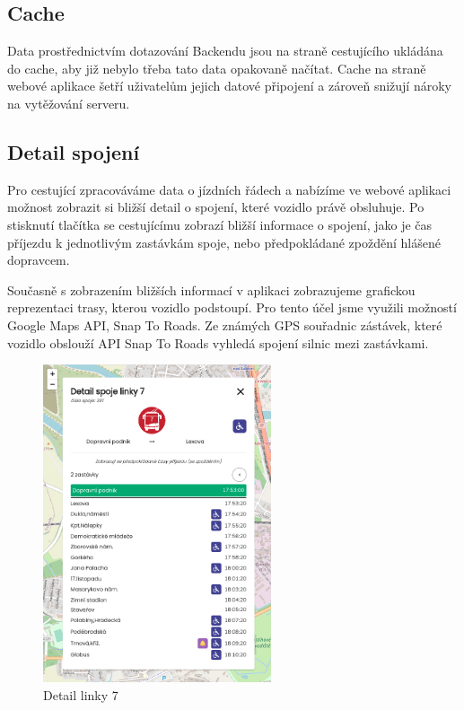 \subsection{Cache}
Data prostřednictvím dotazování Backendu jsou na straně cestujícího ukládána do cache, aby již nebylo třeba tato data opakovaně načítat.
Cache na straně webové aplikace šetří uživatelům jejich datové připojení a zároveň snižují nároky na vytěžování serveru.

\subsection{Detail spojení}
Pro cestující zpracováváme data o jízdních řádech a nabízíme ve webové aplikaci možnost zobrazit si bližší detail o spojení, které vozidlo právě obsluhuje.
Po stisknutí tlačítka se cestujícímu zobrazí bližší informace o spojení, jako je čas příjezdu k jednotlivým zastávkám spoje, nebo předpokládané zpoždění hlášené dopravcem.

Současně s zobrazením bližších informací v aplikaci zobrazujeme grafickou reprezentaci trasy, kterou vozidlo podstoupí.
Pro tento účel jsme využili možností Google Maps API, Snap To Roads. Ze známých GPS souřadnic zástávek, které vozidlo obslouží API Snap To Roads vyhledá spojení silnic mezi zastávkami.

\par
\begin{figure}[h]
    \centering
    \includegraphics[width=0.6\textwidth]{images/global_pce_con_detail_7.png}
    \caption{Detail linky 7}

\end{figure}

